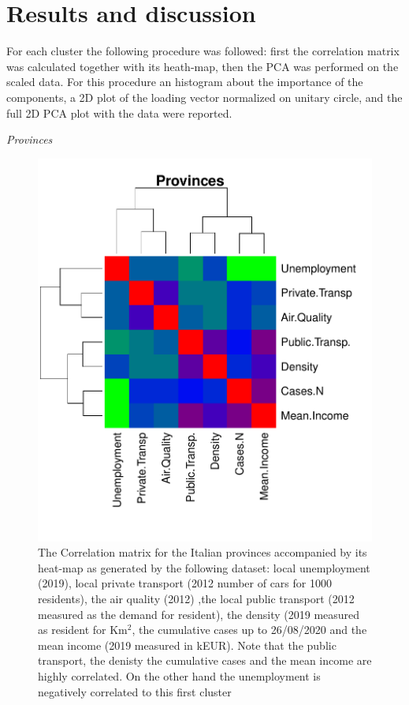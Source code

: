 \documentclass[
12pt, %
a4paper, %
oneside, %
headinclude,footinclude, %
BCOR5mm, %
]{scrartcl}
\begin{document}
\section{Results and discussion}

For each cluster the following procedure was followed: first the correlation matrix was calculated together with its heath-map, then the PCA was performed on the scaled data. For this procedure an histogram about the importance of the components, a 2D plot of the loading vector normalized on unitary circle, and the full 2D PCA plot with the data were reported. 

\textit{Provinces}

\begin{figure}[h]
\includegraphics[scale=1]{Pic/Province_FULL_CorrMatrix.pdf}
\caption{The Correlation matrix for the Italian provinces accompanied by its heat-map as generated by the following dataset: local unemployment (2019), local private transport (2012 number of cars for 1000 residents), the air quality (2012) ,the local public transport (2012 measured as the demand for resident), the density  (2019 measured as resident for Km$^{2}$, the cumulative cases up to 26/08/2020 and the mean income (2019 measured in kEUR). Note that the public transport, the denisty the cumulative cases and the mean income are highly correlated. On the other hand the unemployment is negatively correlated to this first cluster}
\end{figure}
\end{document}
